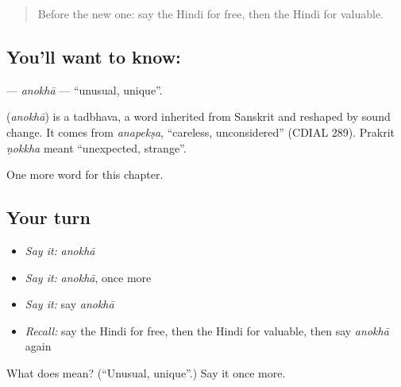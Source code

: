 \label{lesson:HI-C241-anokha}



\begin{quote}
Before the new one: say the Hindi for free, then the Hindi for valuable.
\end{quote}

\subsection*{You'll want to know: }
\textbf{} — \emph{anokhā} — \textquotedblleft{}unusual, unique\textquotedblright{}.

\begin{cousinweb}
\textbf{} (\emph{anokhā}) is a tadbhava, a word inherited from Sanskrit and reshaped by sound change. It comes from \emph{anapekṣa}, \textquotedblleft{}careless, unconsidered\textquotedblright{} (CDIAL 289). Prakrit \emph{ṇokkha} meant \textquotedblleft{}unexpected, strange\textquotedblright{}.
\end{cousinweb}

\begin{grammarlens}[title={What you've built}]
One more word for this chapter.
\end{grammarlens}

\subsection*{Your turn}
\begin{itemize}
\raggedright
  \item \emph{Say it:} \emph{anokhā}
  \item \emph{Say it:} \emph{anokhā}, once more
  \item \emph{Say it:} say \emph{anokhā}
  \item \emph{Recall:} say the Hindi for free, then the Hindi for valuable, then say \emph{anokhā} again
\end{itemize}

\begin{tcolorbox}[breakable,colback=teal!4,colframe=teal!35!black,title={Before you move on}]
What does  mean? (\textquotedblleft{}Unusual, unique\textquotedblright{}.) Say it once more.
\end{tcolorbox}
